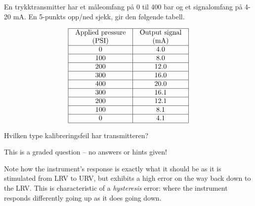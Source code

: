 


En trykktransmitter har et m{\aa}leomfang p{\aa} 0 til 400 bar og et signalomfang p{\aa} 4-20 mA. En 5-punkts opp/ned sjekk, gir den f{\o}lgende tabell. 


$$\vbox{\offinterlineskip
\halign{\strut
\vrule \quad\hfil # \ \hfil & 
\vrule \quad\hfil # \ \hfil \vrule \cr
\noalign{\hrule}
%
Applied pressure & Output signal \cr
%
(PSI) & (mA) \cr
%
\noalign{\hrule}
%
0 & 4.0 \cr
%
\noalign{\hrule}
%
100 & 8.0 \cr
%
\noalign{\hrule}
%
200 & 12.0 \cr
%
\noalign{\hrule}
%
300 & 16.0 \cr
%
\noalign{\hrule}
%
400 & 20.0 \cr
%
\noalign{\hrule}
%
300 & 16.1 \cr
%
\noalign{\hrule}
%
200 & 12.1 \cr
%
\noalign{\hrule}
%
100 & 8.1 \cr
%
\noalign{\hrule}
%
0 & 4.1 \cr
%
\noalign{\hrule}
} %
}$$ %

\vskip 10pt

Hvilken type kalibreringsfeil har transmitteren?

\vfil 

\eject






This is a graded question -- no answers or hints given!







Note how the instrument's response is exactly what it should be as it is stimulated from LRV to URV, but exhibits a high error on the way back down to the LRV.  This is characteristic of a {\it hysteresis} error: where the instrument responds differently going up as it does going down.




